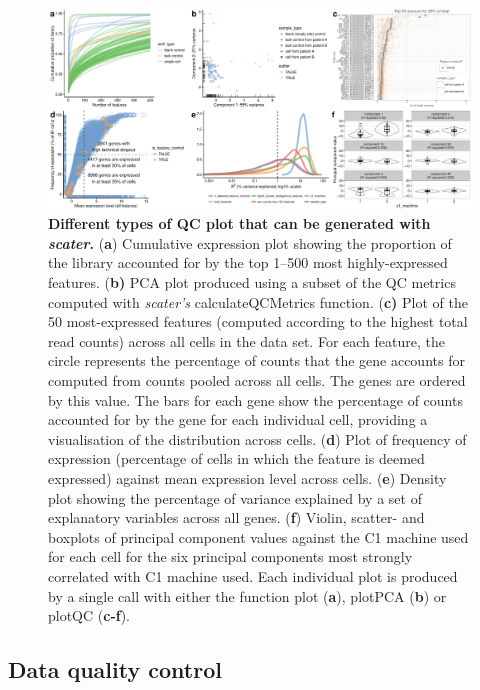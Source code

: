 \documentclass{bioinfo}
\begin{document}
\begin{figure}[!htpb]%
\centerline{\includegraphics[width=\textwidth]{figures/figure3.pdf}}
\caption{\textbf{Different types of QC plot that can be generated with \emph{scater}.} (\textbf{a}) Cumulative expression plot showing the proportion of the library accounted for by the top 1--500 most highly-expressed features. (\textbf{b)} PCA plot produced using a subset of the QC metrics computed with \emph{scater's} calculateQCMetrics function. (\textbf{c)} Plot of the 50 most-expressed features (computed according to the highest total read counts) across all cells in the data set. For each feature, the circle represents the percentage of counts that the gene accounts for computed from counts pooled across all cells. The genes are ordered by this value. The bars for each gene show the percentage of counts accounted for by the gene for each individual cell, providing a visualisation of the distribution across cells. (\textbf{d}) Plot of frequency of expression (percentage of cells in which the feature is deemed expressed) against mean expression level across cells. (\textbf{e}) Density plot showing the percentage of variance explained by a set of explanatory variables across all genes. (\textbf{f}) Violin, scatter- and boxplots of principal component values against the C1 machine used for each cell for the six principal components most strongly correlated with C1 machine used. Each individual plot is produced by a single call with either the function plot (\textbf{a}), plotPCA (\textbf{b}) or plotQC (\textbf{c-f}).}\label{fig:03}
\end{figure}


\subsection{Data quality control}\label{data-quality-control}
\end{document}
